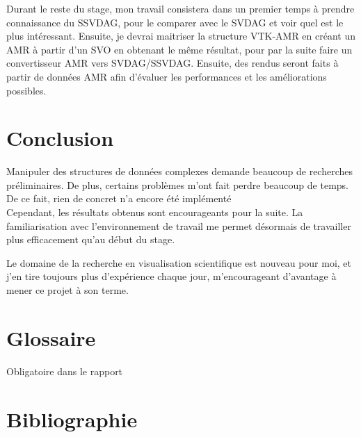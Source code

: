\documentclass[12pt,a4paper,twoside]{article}
\begin{document}
    Durant le reste du stage, mon travail consistera dans un premier temps à prendre connaissance du SSVDAG, pour le
    comparer avec le SVDAG et voir quel est le plus intéressant. Ensuite, je devrai maitriser la structure VTK-AMR en créant un
    AMR à partir d'un SVO en obtenant le même résultat, pour par la suite faire un convertisseur AMR vers SVDAG/SSVDAG.
    Ensuite, des rendus seront faits à partir de données AMR afin d'évaluer les performances et les améliorations possibles.

    \newpage
    \section{Conclusion}                            %

    Manipuler des structures de données complexes demande beaucoup de recherches préliminaires. De plus, certains
    problèmes m'ont fait perdre beaucoup de temps. De ce fait, rien de concret n'a encore été implémenté\\
    Cependant, les résultats obtenus sont encourageants pour la suite. La familiarisation avec l'environnement de travail
    me permet désormais de travailler plus efficacement qu'au début du stage.

    Le domaine de la recherche en visualisation scientifique est nouveau pour moi, et j'en tire toujours plus
    d'expérience chaque jour, m'encourageant d'avantage à mener ce projet à son terme.

    \newpage
    \section{Glossaire}                             %
    Obligatoire dans le rapport


    \newpage
    \section{Bibliographie}                         %

    
    \nocite{*}
\end{document}

